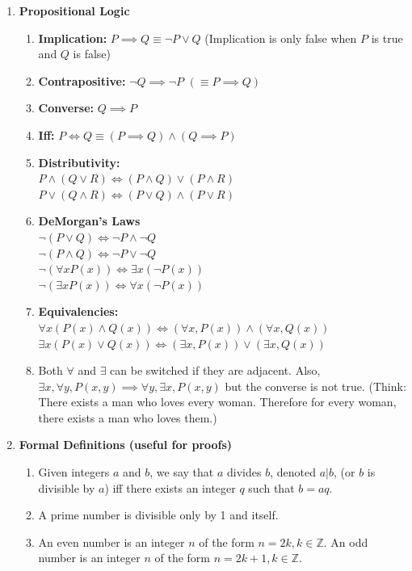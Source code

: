 \documentclass[10pt]{article}
\begin{document}
\begin{multicols}{2}
\begin{enumerate}
    \item \textbf{Propositional Logic}
    \begin{enumerate}
        \item \textbf{Implication:} $P \implies Q \equiv \neg P \lor Q$ (Implication is only false when $P$ is true and $Q$ is false)
        \item \textbf{Contrapositive:} $\neg Q \implies \neg P$ $(\equiv P \implies Q)$
        \item \textbf{Converse:} $Q \implies P$
        \item \textbf{Iff:} $P \iff Q \equiv (P \implies Q) \land (Q \implies P)$
        \item \textbf{Distributivity:} \\ $P \land (Q \lor R) \iff (P \land Q) \lor (P \land R)$ \\
         $P \lor (Q \land R) \iff (P \lor Q) \land (P \lor R)$
        
        \item \textbf{DeMorgan's Laws} \\ $\neg (P \lor Q) \iff \neg P \land \neg Q$ \\
         $\neg (P \land Q) \iff \neg P \lor \neg Q$ \\
         $\neg (\forall x P(x)) \iff \exists x (\neg P(x))$ \\
         $\neg (\exists x P(x)) \iff \forall x (\neg P(x))$ \\
        \item \textbf{Equivalencies:} \\
        $\forall x (P(x) \land Q(x)) \iff (\forall x,P(x)) \land (\forall x,Q(x))$ \\
        $\exists x (P(x) \lor Q(x)) \iff (\exists x,P(x)) \lor (\exists x,Q(x))$
        \item Both $\forall$ and $\exists$ can be switched if they are adjacent. Also, $\exists x, \forall y, P(x,y) \implies \forall y,\exists x,P(x,y)$ but the converse is not true. (Think: There exists a man who loves every woman. Therefore for every woman, there exists a man who loves them.)
    \end{enumerate}
    
    \item \textbf{Formal Definitions (useful for proofs)}
    \begin{enumerate}
        \item Given integers $a$ and $b$, we say that $a$ divides $b$, denoted $a|b$, (or $b$ is divisible by $a$) iff there exists an integer $q$ such that $b = aq$.
        \item A prime number is divisible only by 1 and itself.
        \item An even number is an integer $n$ of the form $n=2k, k \in \mathbb{Z}$. An odd number is an integer $n$ of the form $n=2k+1, k \in \mathbb{Z}$.
    \end{enumerate}
    

\end{enumerate}
\end{multicols}
\end{document}
